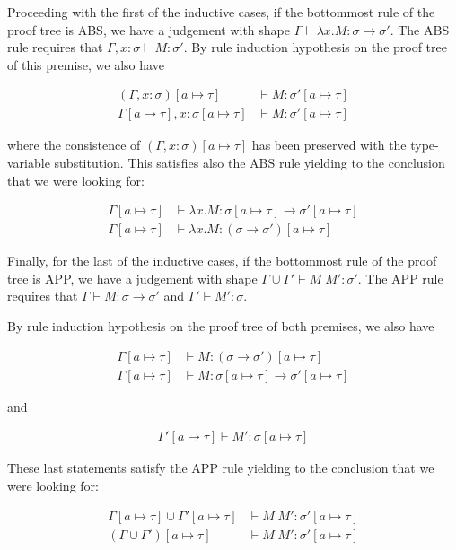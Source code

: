 \documentclass{article}
\begin{document}
Proceeding with the first of the inductive cases, if the bottommost rule of 
the proof tree is ABS, we have a judgement with shape 
$\Gamma \vdash \lambda x. M: \sigma \rightarrow \sigma'$. The 
ABS rule requires that $\Gamma, x: \sigma \vdash M: \sigma'$.
By rule induction hypothesis on the proof tree of this premise, we 
also have 

\begin{align*}
(\Gamma, x: \sigma)[a \mapsto \tau] 
  &\vdash M: \sigma'[a \mapsto \tau] \\
\Gamma[a \mapsto \tau], x: \sigma[a \mapsto \tau]
  &\vdash M: \sigma'[a \mapsto \tau]
\end{align*}

where the consistence of $(\Gamma, x: \sigma)[a \mapsto \tau]$
has been preserved with the type-variable substitution. This satisfies 
also the ABS rule yielding to the conclusion that we were looking for:

\begin{align*}
\Gamma[a \mapsto \tau] 
  &\vdash \lambda x. M: \sigma[a \mapsto \tau] \rightarrow \sigma'[a \mapsto \tau] \\
\Gamma[a \mapsto \tau] 
  &\vdash \lambda x. M: (\sigma \rightarrow \sigma')[a \mapsto \tau]
\end{align*}

Finally, for the last of the inductive cases, if the bottommost rule of the proof 
tree is APP, we have a judgement with shape
$\Gamma \cup \Gamma' \vdash M\;M': \sigma'$. The 
APP rule requires that $\Gamma \vdash M : \sigma \rightarrow \sigma'$
and $\Gamma' \vdash M' : \sigma$.

By rule induction hypothesis on the proof tree of both premises, we
also have

\begin{align*}
\Gamma[a \mapsto \tau] 
  &\vdash M : (\sigma \rightarrow \sigma')[a \mapsto \tau] \\
\Gamma[a \mapsto \tau]
  &\vdash M : \sigma[a \mapsto \tau] \rightarrow \sigma'[a \mapsto \tau]
\end{align*}

and 

\begin{align*}
\Gamma'[a \mapsto \tau] \vdash M' : \sigma[a \mapsto \tau] 
\end{align*}

These last statements satisfy the APP rule yielding to 
the conclusion that we were looking for:

\begin{align*}
\Gamma[a \mapsto \tau] \cup \Gamma'[a \mapsto \tau] 
  &\vdash M\;M': \sigma'[a \mapsto \tau] \\
(\Gamma \cup \Gamma')[a \mapsto \tau] 
  &\vdash M\;M': \sigma'[a \mapsto \tau]
\end{align*}
\end{document}
